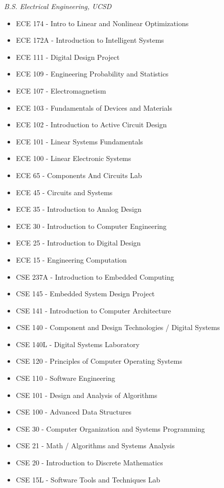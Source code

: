 \documentclass[line,margin]{res}
\begin{document}
\begin{resume}
	{\sl B.S. Electrical Engineering, UCSD}
	\begin{itemize}
		\item ECE 174 - Intro to Linear and Nonlinear Optimizations
		\item ECE 172A - Introduction to Intelligent Systems
		\item ECE 111 - Digital Design Project
		\item ECE 109 - Engineering Probability and Statistics
		\item ECE 107 - Electromagnetism
		\item ECE 103 - Fundamentals of Devices and Materials
		\item ECE 102 - Introduction to Active Circuit Design
		\item ECE 101 - Linear Systems Fundamentals
		\item ECE 100 - Linear Electronic Systems
		\item ECE 65 - Components And Circuits Lab
		\item ECE 45 - Circuits and Systems
		\item ECE 35 - Introduction to Analog Design
		\item ECE 30 - Introduction to Computer Engineering
		\item ECE 25 - Introduction to Digital Design
		\item ECE 15 - Engineering Computation
		\item CSE 237A - Introduction to Embedded Computing
		\item CSE 145 - Embedded System Design Project
		\item CSE 141 - Introduction to Computer Architecture
		\item CSE 140 - Component and Design Technologies / Digital Systems
		\item CSE 140L - Digital Systems Laboratory
		\item CSE 120 - Principles of Computer Operating Systems
		\item CSE 110 - Software Engineering
		\item CSE 101 - Design and Analysis of Algorithms
		\item CSE 100 - Advanced Data Structures
		\item CSE 30 - Computer Organization and Systems Programming
		\item CSE 21 - Math / Algorithms and Systems Analysis
		\item CSE 20 - Introduction to Discrete Mathematics
		\item CSE 15L - Software Tools and Techniques Lab

\end{itemize}
\end{resume}
\end{document}
